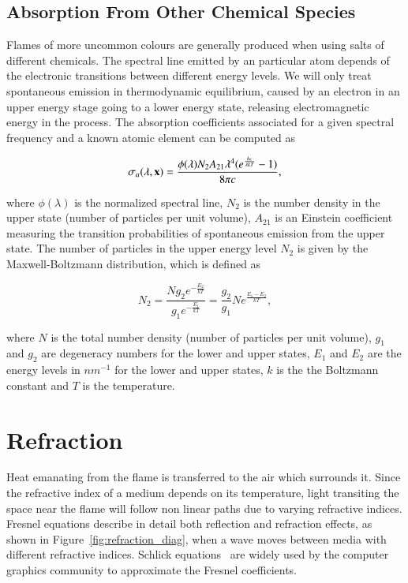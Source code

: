 \FloatBarrier
\subsection{Absorption From Other Chemical Species}
\label{sec:absorption_from_chemical_species}

Flames of more uncommon colours are generally produced when using salts of different chemicals.
The spectral line emitted by an particular atom depends of the electronic transitions between different energy levels.
We will only treat spontaneous emission in thermodynamic equilibrium, caused by an electron in an upper energy stage going to a lower energy state, releasing electromagnetic energy in the process.
The absorption coefficients associated for a given spectral frequency and a known atomic element can be computed as

\begin{equation}
\sigma_a(\lambda, \mathbf{x}) = \frac{\phi(\lambda) N_2 A_{21} \lambda^4 (e ^\frac{h c}{\lambda k T} - 1)}{8 \pi c},
\end{equation}

where $\phi(\lambda)$ is the normalized spectral line, $N_2$ is the number density in the upper state (number of particles per unit volume), $A_{21}$ is an Einstein coefficient measuring the transition probabilities of spontaneous emission from the upper state.
The number of particles in the upper energy level $N_2$ is given by the Maxwell-Boltzmann distribution, which is defined as

\begin{equation}
N_2 = \frac{N g_2 e^{-\frac{E_2}{kT}}}{g_1 e^{-\frac{E_1}{kT}}} = \frac{g_2}{g_1} N e ^{\frac{E_1 - E_2}{kT}},
\end{equation}

where $N$ is the total number density (number of particles per unit volume), $g_1$ and $g_2$ are degeneracy numbers for the lower and upper states, $E_1$ and $E_2$ are the energy levels in $nm^{-1}$ for the lower and upper states, $k$ is the the Boltzmann constant and $T$ is the temperature.

\section{Refraction}
\label{sec:refraction}

Heat emanating from the flame is transferred to the air which surrounds it.
Since the refractive index of a medium depends on its temperature, light transiting the space near the flame will follow non linear paths due to varying refractive indices.
Fresnel equations describe in detail both reflection and refraction effects, as shown in Figure~\ref{fig:refraction_diag}, when a wave moves between media with different refractive indices.
Schlick equations~\cite{Schlick1994} are widely used by the computer graphics community to approximate the Fresnel coefficients.

